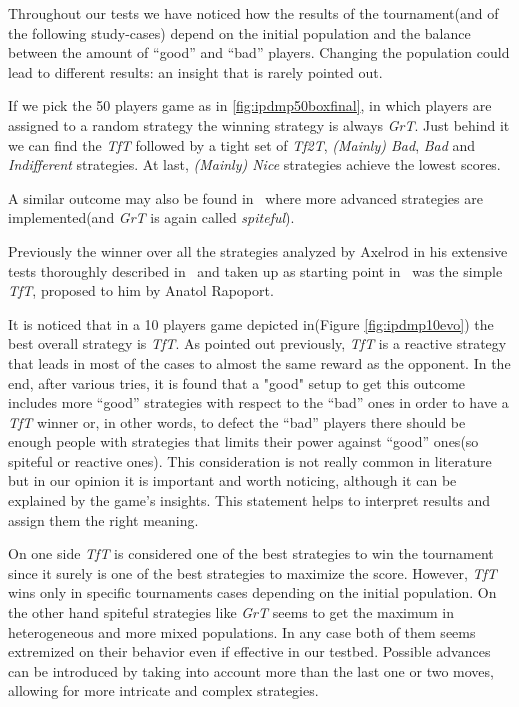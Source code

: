 \documentclass[journal,10pt,twoside]{IEEEtran}
\begin{document}
Throughout our tests we have noticed how the results of the tournament(and of the following study-cases) depend on the initial population and the balance between the amount of ``good'' and ``bad'' players. Changing the population could lead to different results: an insight that is rarely pointed out.


If we pick the 50 players game as in \autoref{fig:ipdmp50boxfinal}, in which players are assigned to a random strategy the winning strategy is always \textit{GrT}. Just behind it we can find the \textit{TfT} followed by a tight set of \textit{Tf2T}, \textit{(Mainly) Bad}, \textit{Bad} and \textit{Indifferent} strategies. At last, \textit{(Mainly) Nice} strategies achieve the lowest scores.

A similar outcome may also be found in~\cite{mathieu2017} where more advanced strategies are implemented(and \textit{GrT} is again called \textit{spiteful}). 

Previously the winner over all the strategies analyzed by Axelrod in his extensive tests thoroughly described in~\cite{axelrod1981evolution,axelrod1984evolution} and taken up as starting point in~\cite{mathieu2017} was the simple \textit{TfT}, proposed to him by Anatol Rapoport.

It is noticed that in a 10 players game depicted in(Figure \ref{fig:ipdmp10evo}) the best overall strategy is \textit{TfT}. As pointed out previously, \textit{TfT} is a reactive strategy that leads in most of the cases to almost the same reward as the opponent. In the end, after various tries, it is found that a "good" setup to get this outcome includes more ``good'' strategies with respect to the ``bad'' ones in order to have a \textit{TfT} winner or, in other words, to defect the ``bad'' players there should be enough people with strategies that limits their power against ``good'' ones(so spiteful or reactive ones). This consideration is not really common in literature but in our opinion it is important and worth noticing, although it can be explained by the game's insights. This statement helps to interpret results and assign them the right meaning. 

On one side \textit{TfT} is considered one of the best strategies to win the tournament since it surely is one of the best strategies to maximize the score. However, \textit{TfT} wins only in specific tournaments cases depending on the initial population. On the other hand spiteful strategies like \textit{GrT} seems to get the maximum in heterogeneous and more mixed populations. In any case both of them seems extremized on their behavior even if effective in our testbed. Possible advances can be introduced by taking into account more than the last one or two moves, allowing for more intricate and complex strategies.\cite{mathieu2017} 
\end{document}
